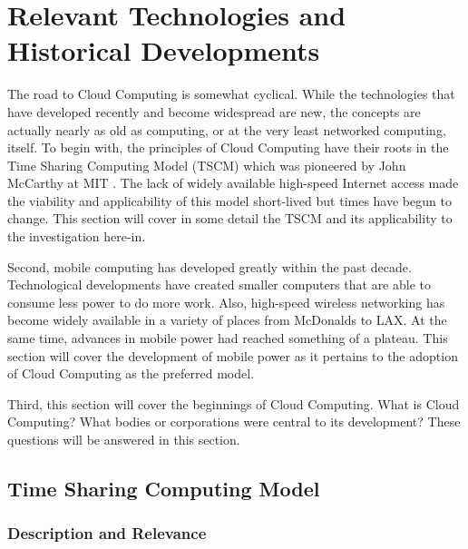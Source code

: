 \documentclass[12pt,oneside,letterpaper,titlepage]{article}
\begin{document}
\section{Relevant Technologies and Historical Developments}

The road to Cloud Computing is somewhat cyclical.  While the technologies that
have developed recently and become widespread are new, the concepts are actually
nearly as old as computing, or at the very least networked computing, itself.
To begin with, the principles of Cloud Computing have their roots in the Time
Sharing Computing Model (TSCM) which was pioneered by John McCarthy at MIT
\citep{levy1994}.  The lack of widely available high-speed Internet access made the
viability and applicability of this model short-lived but times have begun to
change.  This section will cover in some detail the TSCM and its applicability
to the investigation here-in.

Second, mobile computing has developed greatly within the past decade.
Technological developments have created smaller computers that are able to
consume less power to do more work.  Also, high-speed wireless networking has
become widely available in a variety of places from McDonalds to LAX.  At the
same time, advances in mobile power had reached something of a plateau.  This
section will cover the development of mobile power as it pertains to the
adoption of Cloud Computing as the preferred model.

Third, this section will cover the beginnings of Cloud Computing.  What is Cloud
Computing?  What bodies or corporations were central to its development?  These
questions will be answered in this section.

\subsection{Time Sharing Computing Model}

\subsubsection{Description and Relevance}
\end{document}
